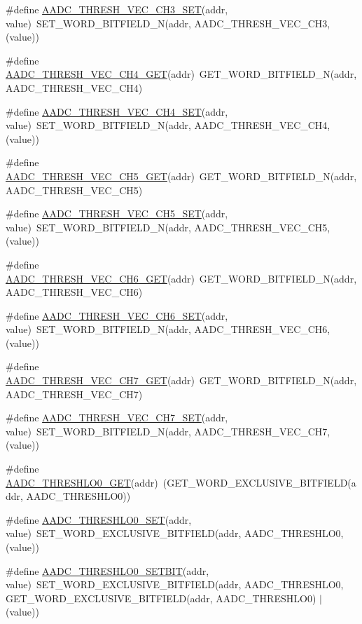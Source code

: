 \begin{DoxyCompactItemize}
\item 
\#define \hyperlink{a00542_a4489e249faed59c64ed6cb4cd05d1e3b}{AADC\_\-THRESH\_\-VEC\_\-CH3\_\-SET}(addr, value)~SET\_\-WORD\_\-BITFIELD\_\-N(addr, AADC\_\-THRESH\_\-VEC\_\-CH3, (value))
\item 
\#define \hyperlink{a00542_a7fa8a49ca136513971e31a9743580932}{AADC\_\-THRESH\_\-VEC\_\-CH4\_\-GET}(addr)~GET\_\-WORD\_\-BITFIELD\_\-N(addr, AADC\_\-THRESH\_\-VEC\_\-CH4)
\item 
\#define \hyperlink{a00542_a86965299556543519a625c7b179744ec}{AADC\_\-THRESH\_\-VEC\_\-CH4\_\-SET}(addr, value)~SET\_\-WORD\_\-BITFIELD\_\-N(addr, AADC\_\-THRESH\_\-VEC\_\-CH4, (value))
\item 
\#define \hyperlink{a00542_a2c853dbb87f090bc954cfbb87fc30bf9}{AADC\_\-THRESH\_\-VEC\_\-CH5\_\-GET}(addr)~GET\_\-WORD\_\-BITFIELD\_\-N(addr, AADC\_\-THRESH\_\-VEC\_\-CH5)
\item 
\#define \hyperlink{a00542_a103f79f6b26aad858bb7d76f5c6b65a2}{AADC\_\-THRESH\_\-VEC\_\-CH5\_\-SET}(addr, value)~SET\_\-WORD\_\-BITFIELD\_\-N(addr, AADC\_\-THRESH\_\-VEC\_\-CH5, (value))
\item 
\#define \hyperlink{a00542_a445880f20b77df8083973fca4461079b}{AADC\_\-THRESH\_\-VEC\_\-CH6\_\-GET}(addr)~GET\_\-WORD\_\-BITFIELD\_\-N(addr, AADC\_\-THRESH\_\-VEC\_\-CH6)
\item 
\#define \hyperlink{a00542_adb7c76dd6096736eb9aab185caf6b0ee}{AADC\_\-THRESH\_\-VEC\_\-CH6\_\-SET}(addr, value)~SET\_\-WORD\_\-BITFIELD\_\-N(addr, AADC\_\-THRESH\_\-VEC\_\-CH6, (value))
\item 
\#define \hyperlink{a00542_a963659f11a61ff47d973d627073d5383}{AADC\_\-THRESH\_\-VEC\_\-CH7\_\-GET}(addr)~GET\_\-WORD\_\-BITFIELD\_\-N(addr, AADC\_\-THRESH\_\-VEC\_\-CH7)
\item 
\#define \hyperlink{a00542_a59c578e0c27621727068463291b60eb1}{AADC\_\-THRESH\_\-VEC\_\-CH7\_\-SET}(addr, value)~SET\_\-WORD\_\-BITFIELD\_\-N(addr, AADC\_\-THRESH\_\-VEC\_\-CH7, (value))
\item 
\#define \hyperlink{a00542_afdb11c1817ed5c3e70e75ef3371a1ee1}{AADC\_\-THRESHLO0\_\-GET}(addr)~(GET\_\-WORD\_\-EXCLUSIVE\_\-BITFIELD(addr, AADC\_\-THRESHLO0))
\item 
\#define \hyperlink{a00542_ad0caaeb03a1d3241f075d074c932ff21}{AADC\_\-THRESHLO0\_\-SET}(addr, value)~SET\_\-WORD\_\-EXCLUSIVE\_\-BITFIELD(addr, AADC\_\-THRESHLO0, (value))
\item 
\#define \hyperlink{a00542_a1d87c3b81389aa26abc7fb6e47c513b7}{AADC\_\-THRESHLO0\_\-SETBIT}(addr, value)~SET\_\-WORD\_\-EXCLUSIVE\_\-BITFIELD(addr, AADC\_\-THRESHLO0, GET\_\-WORD\_\-EXCLUSIVE\_\-BITFIELD(addr, AADC\_\-THRESHLO0) $|$ (value))

\end{DoxyCompactItemize}
